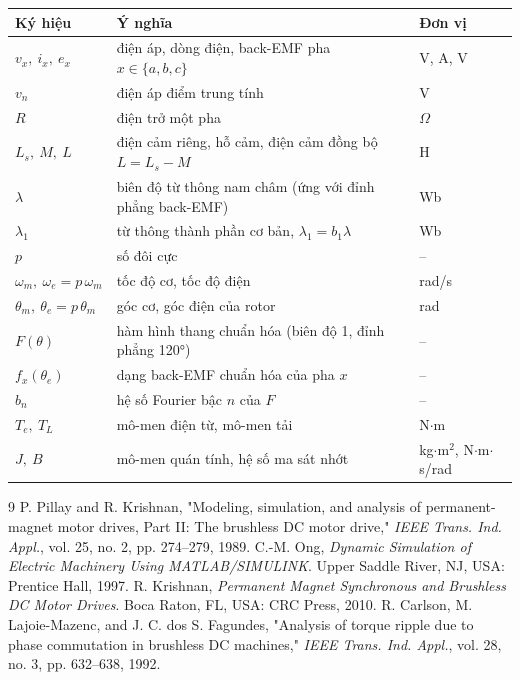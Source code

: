 \documentclass[11pt,a4paper]{article}
\begin{document}
\begin{center}\small
\begin{tabularx}{\linewidth}{@{}l>{\raggedright\arraybackslash}Xl@{}}
\toprule
Ký hiệu & Ý nghĩa & Đơn vị \\ \midrule
$v_x,\ i_x,\ e_x$ & điện áp, dòng điện, back-EMF pha $x\in\{a,b,c\}$ & V, A, V \\
$v_n$ & điện áp điểm trung tính & V \\
$R$ & điện trở một pha & $\Omega$ \\
$L_s,\ M,\ L$ & điện cảm riêng, hỗ cảm, điện cảm đồng bộ $L = L_s - M$ & H \\
$\lambda$ & biên độ từ thông nam châm (ứng với đỉnh phẳng back-EMF) & Wb \\
$\lambda_1$ & từ thông thành phần cơ bản, $\lambda_1 = b_1\lambda$ & Wb \\
$p$ & số đôi cực & – \\
$\omega_m,\ \omega_e = p\,\omega_m$ & tốc độ cơ, tốc độ điện & rad/s \\
$\theta_m,\ \theta_e = p\,\theta_m$ & góc cơ, góc điện của rotor & rad \\
$F(\theta)$ & hàm hình thang chuẩn hóa (biên độ 1, đỉnh phẳng 120°) & – \\
$f_x(\theta_e)$ & dạng back-EMF chuẩn hóa của pha $x$ & – \\
$b_n$ & hệ số Fourier bậc $n$ của $F$ & – \\
$T_e,\ T_L$ & mô-men điện từ, mô-men tải & N$\cdot$m \\
$J,\ B$ & mô-men quán tính, hệ số ma sát nhớt & kg$\cdot$m$^2$, N$\cdot$m$\cdot$s/rad \\
\bottomrule
\end{tabularx}
\end{center}

\setcounter{section}{1}


\begin{thebibliography}{9}
\small
{} P. Pillay and R. Krishnan, "Modeling, simulation, and analysis of permanent-magnet motor drives, Part II: The brushless DC motor drive," \emph{IEEE Trans. Ind. Appl.}, vol. 25, no. 2, pp. 274–279, 1989.
 C.-M. Ong, \emph{Dynamic Simulation of Electric Machinery Using MATLAB/SIMULINK}. Upper Saddle River, NJ, USA: Prentice Hall, 1997.
 R. Krishnan, \emph{Permanent Magnet Synchronous and Brushless DC Motor Drives}. Boca Raton, FL, USA: CRC Press, 2010.
 R. Carlson, M. Lajoie-Mazenc, and J. C. dos S. Fagundes, "Analysis of torque ripple due to phase commutation in brushless DC machines," \emph{IEEE Trans. Ind. Appl.}, vol. 28, no. 3, pp. 632–638, 1992.
\end{thebibliography}
\end{document}
